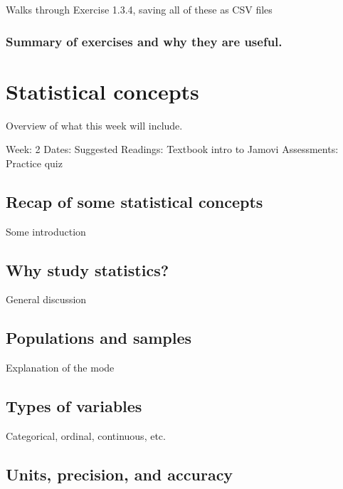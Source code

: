 \documentclass[
]{book}
\begin{document}
Walks through Exercise 1.3.4, saving all of these as CSV files

\hypertarget{summary-of-exercises-and-why-they-are-useful.}{%
\section{Summary of exercises and why they are useful.}\label{summary-of-exercises-and-why-they-are-useful.}}

\hypertarget{part-statistical-concepts}{%
\part{Statistical concepts}\label{part-statistical-concepts}}

Overview of what this week will include.

Week: 2
Dates:
Suggested Readings: Textbook intro to Jamovi
Assessments: Practice quiz

\hypertarget{recap-of-some-statistical-concepts}{%
\chapter{Recap of some statistical concepts}\label{recap-of-some-statistical-concepts}}

Some introduction

\hypertarget{why-study-statistics}{%
\chapter{Why study statistics?}\label{why-study-statistics}}

General discussion

\hypertarget{populations-and-samples}{%
\chapter{Populations and samples}\label{populations-and-samples}}

Explanation of the mode

\hypertarget{types-of-variables}{%
\chapter{Types of variables}\label{types-of-variables}}

Categorical, ordinal, continuous, etc.

\hypertarget{units-precision-and-accuracy}{%
\chapter{Units, precision, and accuracy}\label{units-precision-and-accuracy}}
\end{document}

